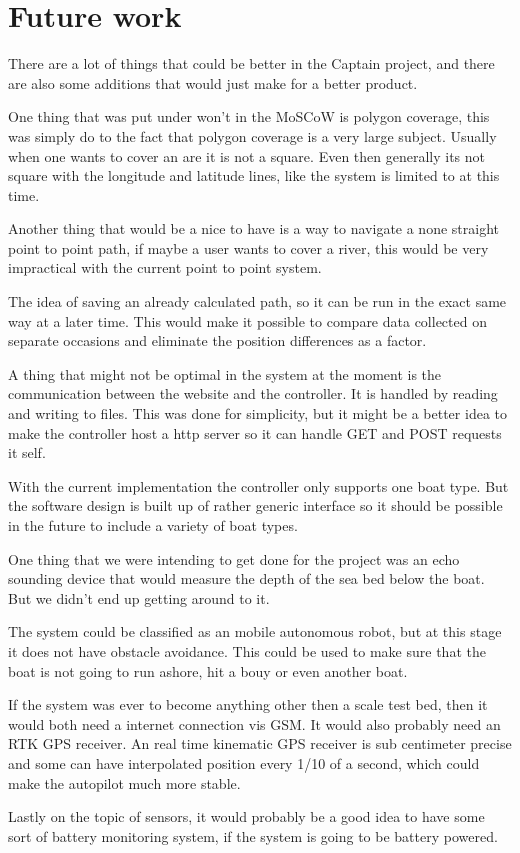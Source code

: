 \chapter{Future work}
There are a lot of things that could be better in the Captain project, and there are also some additions that would just make for a better product.

One thing that was put under won't in the MoSCoW is polygon coverage, this was simply do to the fact that polygon coverage is a very large subject. Usually when one wants to cover an are it is not a square. Even then generally its not square with the longitude and latitude lines, like the system is limited to at this time. 

Another thing that would be a nice to have is a way to navigate a none straight point to point path, if maybe a user wants to cover a river, this would be very impractical with the current point to point system. 

The idea of saving an already calculated path, so it can be run in the exact same way at a later time. This would make it possible to compare data collected on separate occasions and eliminate the position differences as a factor.

A thing that might not be optimal in the system at the moment is the communication between the website and the controller. It is handled by reading and writing to files. This was done for simplicity, but it might be a better idea to make the controller host a http server so it can handle GET and POST requests it self.  

With the current implementation the controller only supports one boat type. But the software design is built up of rather generic interface so it should be possible in the future to include a variety of boat types.

One thing that we were intending to get done for the project was an echo sounding device that would measure the depth of the sea bed below the boat. But we didn't end up getting around to it.

The system could be classified as an mobile autonomous robot, but at this stage it does not have obstacle avoidance. This could be used to make sure that the boat is not going to run ashore, hit a bouy or even another boat. 

If the system was ever to become anything other then a scale test bed, then it would both need a internet connection vis GSM. It would also probably need an RTK GPS receiver. An real time kinematic GPS receiver is sub centimeter precise and some can have interpolated position every 1/10 of a second, which could make the autopilot much more stable.

Lastly on the topic of sensors, it would probably be a good idea to have some sort of battery monitoring system, if the system is going to be battery powered. 

